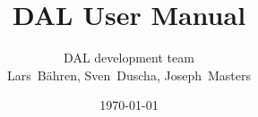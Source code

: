 \documentclass[a4paper,fontsize=10pt]{scrartcl}
\begin{document}
\pagestyle{fancy}
\renewcommand{\footrulewidth}{0.4pt}
\fancyfoot[C]{}
\fancyfoot[R]{\thepage}

\title{DAL User Manual}
\author{DAL development team \\ \small Lars~B\"ahren, Sven~Duscha, Joseph~Masters}
\date{\normalsize\today}
\maketitle{}

\tableofcontents
\end{document}

